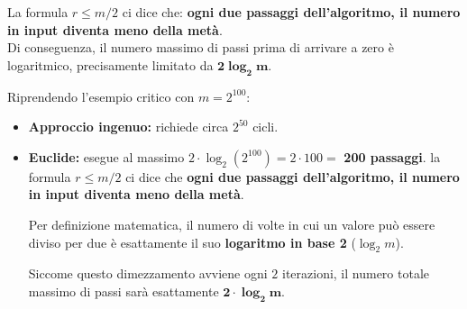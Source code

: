 \documentclass[openany,a4paper,12pt]{book}
\begin{document}
\begin{nota}[title={Risultato sulle prestazioni}]
La formula $r \le m/2$ ci dice che: \textbf{ogni due passaggi dell'algoritmo, il numero in input diventa meno della metà}. \\
Di conseguenza, il numero massimo di passi prima di arrivare a zero è logaritmico, precisamente limitato da $\mathbf{2 \log_2 m}$.

Riprendendo l'esempio critico con $m = 2^{100}$:
\begin{itemize}
    \item \textbf{Approccio ingenuo:} richiede circa $2^{50}$ cicli.
    \item \textbf{Euclide:} esegue al massimo $2 \cdot \log_2(2^{100}) = 2 \cdot 100 =$ \textbf{200 passaggi}.
la formula $r \le m/2$ ci dice che \textbf{ogni due passaggi dell'algoritmo, il numero in input diventa meno della metà}. 

Per definizione matematica, il numero di volte in cui un valore può essere diviso per due è esattamente il suo \textbf{logaritmo in base 2} ($\log_2 m$).

Siccome questo dimezzamento avviene ogni $2$ iterazioni, il numero totale massimo di passi sarà esattamente $\mathbf{2 \cdot \log_2 m}$.\\
\\
\end{itemize}
\end{nota}
\end{document}
